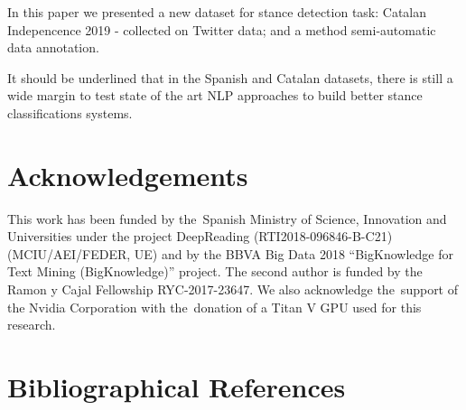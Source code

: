 \documentclass[10pt, a4paper]{article}
\begin{document}
In this paper we presented a new dataset for stance detection task: Catalan Indepencence 2019 - collected on Twitter data; and a method semi-automatic data annotation.

It should be underlined that in the Spanish and Catalan datasets, there is still a wide margin to test state of the art NLP approaches to build better stance classifications systems.

\section{Acknowledgements}\label{sec:acknoledgements}

This work has been funded by the~Spanish Ministry of Science, Innovation and Universities under the project DeepReading (RTI2018-096846-B-C21) (MCIU/AEI/FEDER, UE) and by the BBVA Big Data 2018 ``BigKnowledge for Text Mining (BigKnowledge)'' project. The second author is funded by the Ramon y Cajal Fellowship RYC-2017-23647. We also acknowledge the~support of the Nvidia Corporation with the~donation of a Titan V GPU used for this research.

\section{Bibliographical References}\label{main:ref}





\end{document}
